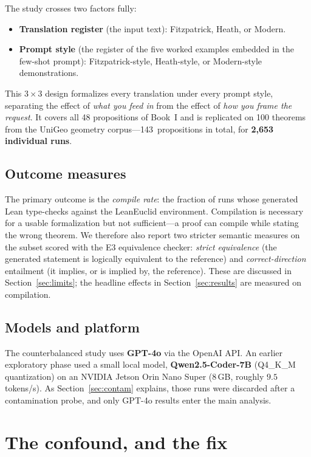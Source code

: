 \documentclass[11pt]{article}
\begin{document}
The study crosses two factors fully:

\begin{itemize}
\setlength{\itemsep}{0.15em}
\item \textbf{Translation register} (the input text): Fitzpatrick, Heath, or
Modern.
\item \textbf{Prompt style} (the register of the five worked examples embedded
in the few-shot prompt): Fitzpatrick-style, Heath-style, or Modern-style
demonstrations.
\end{itemize}

This $3\times3$ design formalizes every translation under every prompt style,
separating the effect of \emph{what you feed in} from the effect of \emph{how
you frame the request}. It covers all 48 propositions of Book~I and is
replicated on 100 theorems from the UniGeo geometry corpus---143~propositions in
total, for \textbf{2{,}653 individual runs}.

\subsection{Outcome measures}

The primary outcome is the \emph{compile rate}: the fraction of runs whose
generated Lean type-checks against the LeanEuclid environment. Compilation is
necessary for a usable formalization but not sufficient---a proof can compile
while stating the wrong theorem. We therefore also report two stricter semantic
measures on the subset scored with the E3 equivalence checker: \emph{strict
equivalence} (the generated statement is logically equivalent to the reference)
and \emph{correct-direction} entailment (it implies, or is implied by, the
reference). These are discussed in Section~\ref{sec:limits}; the headline effects
in Section~\ref{sec:results} are measured on compilation.

\subsection{Models and platform}

The counterbalanced study uses \textbf{GPT-4o} via the OpenAI API. An earlier
exploratory phase used a small local model, \textbf{Qwen2.5-Coder-7B}
(Q4\_K\_M quantization) on an NVIDIA Jetson Orin Nano Super (8\,GB, roughly
$9.5$ tokens/s). As Section~\ref{sec:contam} explains, those runs were discarded
after a contamination probe, and only GPT-4o results enter the main analysis.

\section{The confound, and the fix}
\end{document}

